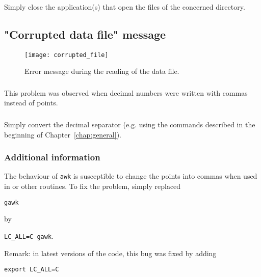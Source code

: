 \subsubsection{\answer}

Simply close the application(s) that open the files of the concerned directory.



\subsection{"Corrupted data file" message}


\begin{figure}[htpb]
\centering
\texttt{[image: corrupted\_file]}
\caption{Error message during the reading of the data file.}
\end{figure}

\subsubsection{\question}


This problem was observed when decimal numbers were written with commas instead of points.


\subsubsection{\answer}

Simply convert the decimal separator (e.g. using the commands described in the beginning of Chapter~\ref{chap:general}).


\subsubsection{Additional information}

The behaviour of \texttt{awk} is susceptible to change the points into commas when used in  or other routines. To fix the problem, simply replaced

\texttt{gawk}

by

\texttt{LC\_ALL=C gawk}.

Remark: in latest versions of the code, this bug was fixed by adding 

\texttt{export LC\_ALL=C}

